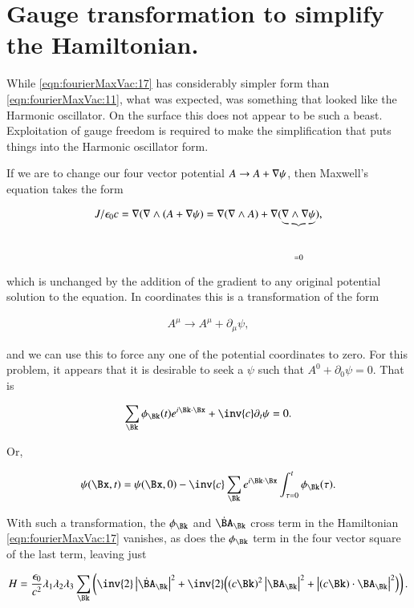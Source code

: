\section{Gauge transformation to simplify the Hamiltonian.}

While \autoref{eqn:fourierMaxVac:17} has considerably simpler form than \autoref{eqn:fourierMaxVac:11}, what was expected, was something that looked like the Harmonic oscillator.  On the surface this does not appear to be such a beast.  Exploitation of gauge freedom is required to make the simplification that puts things into the Harmonic oscillator form.

If we are to change our four vector potential $A \rightarrow A + \nabla \psi$, then Maxwell's equation takes the form

\begin{align}\label{eqn:fourierMaxVac:30}
J/\epsilon_0 c = \nabla (\nabla \wedge (A + \nabla \psi) = \nabla (\nabla \wedge A) + \nabla (\underbrace{\nabla \wedge \nabla \psi}_{=0}),
\end{align}

which is unchanged by the addition of the gradient to any original potential solution to the equation.  In coordinates this is a transformation of the form

\begin{align}\label{eqn:fourierMaxVac:31}
A^\mu \rightarrow A^\mu + \partial_\mu \psi,
\end{align}

and we can use this to force any one of the potential coordinates to zero.  For this problem, it appears that it is desirable to seek a $\psi$ such that $A^0 + \partial_0 \psi = 0$.  That is

\begin{align}\label{eqn:fourierMaxVac:32}
\sum_\Bk \phi_\Bk(t) e^{i \Bk \cdot \Bx} + \inv{c} \partial_t \psi = 0.
\end{align}

Or,

\begin{align}\label{eqn:fourierMaxVac:33}
\psi(\Bx,t) = \psi(\Bx,0) -\inv{c} \sum_\Bk e^{i \Bk \cdot \Bx} \int_{\tau=0}^t \phi_\Bk(\tau).
\end{align}

With such a transformation, the $\phi_\Bk$ and $\dot{\BA}_\Bk$ cross term in the Hamiltonian \autoref{eqn:fourierMaxVac:17} vanishes, as does the $\phi_\Bk$ term in the four vector square of the last term, leaving just

\begin{align}
\label{eqn:fourierMaxVac:17b}
H = 
\frac{\epsilon_0}{c^2} \lambda_1 \lambda_2 \lambda_3 \sum_\Bk
\left(
\inv{2} \Abs{\dot{\BA}_\Bk}^2
+
\inv{2} \Bigl(
(c \Bk)^2 \Abs{\BA_\Bk}^2 + \Abs{ ( c \Bk) \cdot \BA_\Bk}^2
\Bigr)
\right).
\end{align}

